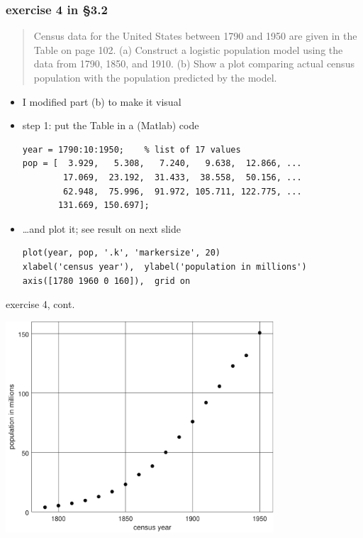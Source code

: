 \documentclass[colorlinks]{beamer}
\begin{document}
\begin{frame}[fragile]

\frametitle{exercise 4 in \S3.2}

\small
\begin{quotation}
\noindent Census data for the United States between 1790 and 1950 are given in the Table on page 102.  (a)   Construct a logistic population model using the data from 1790, 1850, and 1910.  (b)  Show a plot comparing actual census population with the population predicted by the model.
\end{quotation}

\normalsize
\begin{itemize}
\item I modified part (b) to make it visual
\item step 1: put the Table in a (Matlab) code

\begin{Verbatim}[fontsize=\scriptsize]
year = 1790:10:1950;    % list of 17 values
pop = [  3.929,   5.308,   7.240,   9.638,  12.866, ...
        17.069,  23.192,  31.433,  38.558,  50.156, ...
        62.948,  75.996,  91.972, 105.711, 122.775, ...
       131.669, 150.697];
\end{Verbatim}

\item \dots and plot it; see result on next slide

\begin{Verbatim}[fontsize=\scriptsize]
plot(year, pop, '.k', 'markersize', 20)
xlabel('census year'),  ylabel('population in millions')
axis([1780 1960 0 160]),  grid on
\end{Verbatim}
\end{itemize}
\end{frame}


\begin{frame}{exercise 4, cont.}

\begin{center}
\includegraphics[width=0.75\textwidth]{figs/plotcensus}
\end{center}
\end{frame}
\end{document}
